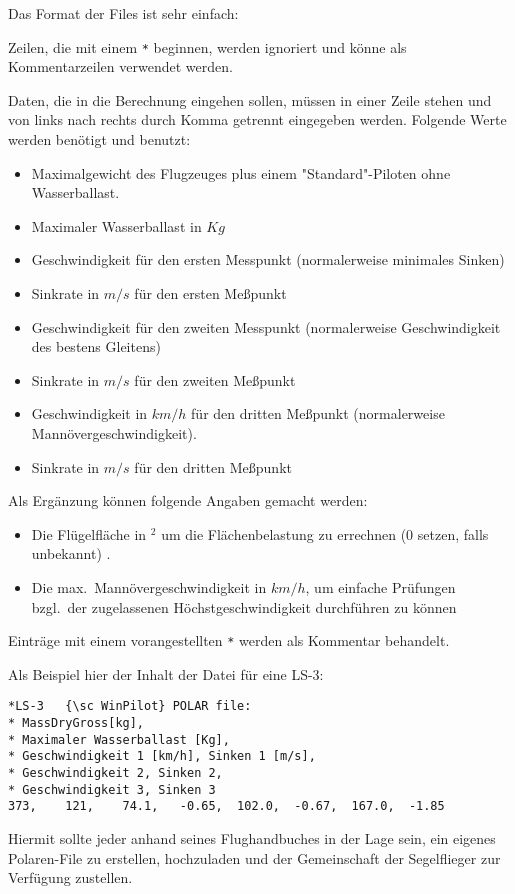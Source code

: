 Das Format der Files ist sehr einfach:

Zeilen, die mit einem \verb|*| beginnen, werden ignoriert und könne als Kommentarzeilen verwendet
werden.

Daten, die in die Berechnung eingehen sollen, müssen in einer Zeile stehen und von links nach rechts durch
Komma getrennt eingegeben werden. Folgende Werte werden benötigt und benutzt:

\begin{itemize}
\item Maximalgewicht des Flugzeuges  plus einem "Standard"-Piloten ohne Wasserballast.
\item Maximaler Wasserballast in $Kg$
\item Geschwindigkeit für den ersten Messpunkt (normalerweise minimales Sinken)
\item Sinkrate in $m/s$ für den ersten Meßpunkt
\item Geschwindigkeit für den zweiten  Messpunkt (normalerweise Geschwindigkeit des bestens
    Gleitens)
\item Sinkrate in $m/s$ für den zweiten Meßpunkt
\item Geschwindigkeit in $km/h$ für den dritten Meßpunkt  (normalerweise Mannövergeschwindigkeit).
\item Sinkrate in $m/s$ für den dritten Meßpunkt
\end{itemize}

Als Ergänzung können folgende Angaben gemacht werden:
\begin{itemize}
\item Die Flügelfläche in $^2$ um die Flächenbelastung zu errechnen  (0 setzen, falls unbekannt) .
\item Die max.\  Mannövergeschwindigkeit in $km/h$, um einfache Prüfungen bzgl.\
 der zugelassenen Höchstgeschwindigkeit durchführen zu können
\end{itemize}

Einträge mit einem vorangestellten \verb|*| werden als Kommentar behandelt.

Als Beispiel hier der Inhalt der Datei für eine LS-3:
\begin{verbatim}
*LS-3	{\sc WinPilot} POLAR file:
* MassDryGross[kg],
* Maximaler Wasserballast [Kg],
* Geschwindigkeit 1 [km/h], Sinken 1 [m/s],
* Geschwindigkeit 2, Sinken 2,
* Geschwindigkeit 3, Sinken 3  	
373,	121,	74.1,	-0.65,	102.0,	-0.67,	167.0,	-1.85
\end{verbatim}

Hiermit sollte jeder anhand seines Flughandbuches in der Lage sein, ein eigenes Polaren-File zu
erstellen, hochzuladen  und der Gemeinschaft der Segelflieger zur Verfügung zustellen.

